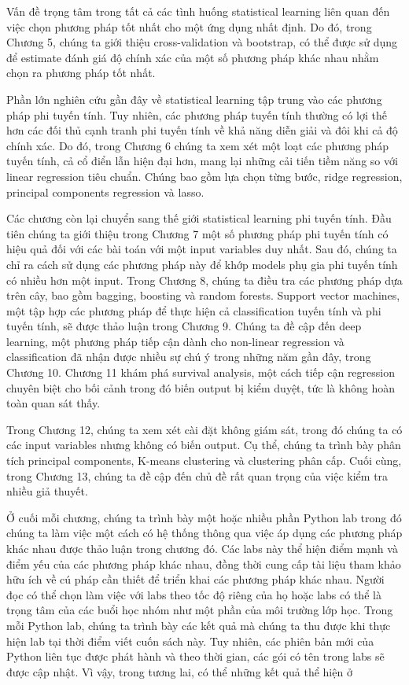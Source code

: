 Vấn đề trọng tâm trong tất cả các tình huống statistical learning liên quan đến việc chọn phương pháp tốt nhất cho một ứng dụng nhất định. Do đó, trong Chương 5, chúng ta giới thiệu cross-validation và bootstrap, có thể được sử dụng để estimate đánh giá độ chính xác của một số phương pháp khác nhau nhằm chọn ra phương pháp tốt nhất.

Phần lớn nghiên cứu gần đây về statistical learning tập trung vào các phương pháp phi tuyến tính. Tuy nhiên, các phương pháp tuyến tính thường có lợi thế hơn các đối thủ cạnh tranh phi tuyến tính về khả năng diễn giải và đôi khi cả độ chính xác. Do đó, trong Chương 6 chúng ta xem xét một loạt các phương pháp tuyến tính, cả cổ điển lẫn hiện đại hơn, mang lại những cải tiến tiềm năng so với linear regression tiêu chuẩn. Chúng bao gồm lựa chọn từng bước, ridge regression, principal components regression và lasso.

Các chương còn lại chuyển sang thế giới statistical learning phi tuyến tính. Đầu tiên chúng ta giới thiệu trong Chương 7 một số phương pháp phi tuyến tính có hiệu quả đối với các bài toán với một input variables duy nhất. Sau đó, chúng ta chỉ ra cách sử dụng các phương pháp này để khớp models phụ gia phi tuyến tính có nhiều hơn một input. Trong Chương 8, chúng ta điều tra các phương pháp dựa trên cây, bao gồm bagging, boosting và random forests. Support vector machines, một tập hợp các phương pháp để thực hiện cả classification tuyến tính và phi tuyến tính, sẽ được thảo luận trong Chương 9. Chúng ta đề cập đến deep learning, một phương pháp tiếp cận dành cho non-linear regression và classification đã nhận được nhiều sự chú ý trong những năm gần đây, trong Chương 10. Chương 11 khám phá survival analysis, một cách tiếp cận regression chuyên biệt cho bối cảnh trong đó biến output bị kiểm duyệt, tức là không hoàn toàn quan sát thấy.

Trong Chương 12, chúng ta xem xét cài đặt không giám sát, trong đó chúng ta có các input variables nhưng không có biến output. Cụ thể, chúng ta trình bày phân tích principal components, K-means clustering và clustering phân cấp. Cuối cùng, trong Chương 13, chúng ta đề cập đến chủ đề rất quan trọng của việc kiểm tra nhiều giả thuyết.

Ở cuối mỗi chương, chúng ta trình bày một hoặc nhiều phần Python lab trong đó chúng ta làm việc một cách có hệ thống thông qua việc áp dụng các phương pháp khác nhau được thảo luận trong chương đó. Các labs này thể hiện điểm mạnh và điểm yếu của các phương pháp khác nhau, đồng thời cung cấp tài liệu tham khảo hữu ích về cú pháp cần thiết để triển khai các phương pháp khác nhau. Người đọc có thể chọn làm việc với labs theo tốc độ riêng của họ hoặc labs có thể là trọng tâm của các buổi học nhóm như một phần của môi trường lớp học. Trong mỗi Python lab, chúng ta trình bày các kết quả mà chúng ta thu được khi thực hiện lab tại thời điểm viết cuốn sách này. Tuy nhiên, các phiên bản mới của Python liên tục được phát hành và theo thời gian, các gói có tên trong labs sẽ được cập nhật. Vì vậy, trong tương lai, có thể những kết quả thể hiện ở

